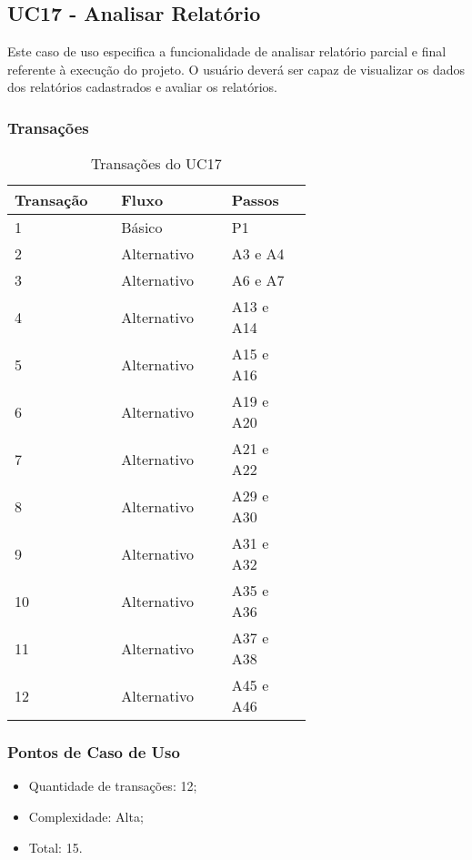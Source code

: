   \vfill

\pagebreak
\subsection{UC17 - Analisar Relatório}
  
  Este caso de uso especifica a funcionalidade de analisar relatório parcial e final referente à execução do projeto.
  O usuário deverá ser capaz de visualizar os dados dos relatórios cadastrados e avaliar os relatórios.
  
  \subsubsection{Transações}

  \begin{table*}[!h]
  \centering
  \caption{Transações do UC17}
  \label{uc17_transactions}
    \begin{tabular}{|p{0.20\linewidth}|p{0.25\linewidth}|p{0.20\linewidth}|}
    \hline
    \textbf{Transação} & \textbf{Fluxo} & \textbf{Passos} \\ 
    \hline
    1 & Básico & P1\\
    \hline
    2 & Alternativo & A3 e A4\\
    \hline
    3 & Alternativo & A6 e A7\\
    \hline
    4 & Alternativo & A13 e A14\\
    \hline
    5 & Alternativo & A15 e A16\\
    \hline
    6 & Alternativo & A19 e A20\\
    \hline
    7 & Alternativo & A21 e A22\\
    \hline
    8 & Alternativo & A29 e A30\\
      \hline
    9 & Alternativo & A31 e A32\\
      \hline
    10 & Alternativo & A35 e A36\\
      \hline
    11 & Alternativo & A37 e A38\\
      \hline
    12 & Alternativo & A45 e A46\\
    \hline
    \end{tabular}
  \end{table*}

  \subsubsection{Pontos de Caso de Uso}

  \begin{itemize}
  \item Quantidade de transações: 12;
  \item Complexidade: Alta;
  \item Total: 15.
  \end{itemize}
  
